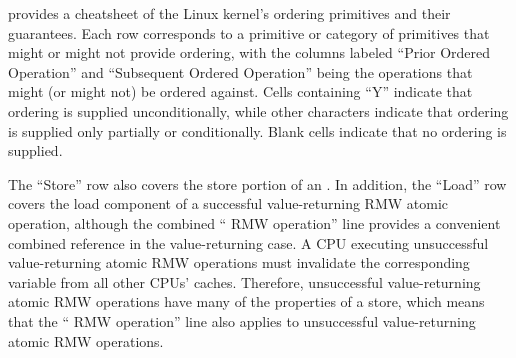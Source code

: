 \begin{table}
\vspace{5pt}\hfill
{}
\caption{Linux-Kernel Memory-Ordering Cheat Sheet}
\label{tab:memorder:Linux-Kernel Memory-Ordering Cheat Sheet}
\end{table}

provides a cheatsheet of the Linux kernel's ordering primitives and their
guarantees.
Each row corresponds to a primitive or category of primitives that might
or might not provide ordering, with the columns labeled
``Prior Ordered Operation'' and ``Subsequent Ordered Operation''
being the operations that might (or might not) be ordered against.
Cells containing ``Y'' indicate that ordering is supplied unconditionally,
while other characters indicate that ordering is supplied only partially or
conditionally.
Blank cells indicate that no ordering is supplied.

The ``Store'' row also covers the store portion of an
.
In addition, the ``Load'' row covers the load
component of a successful value-returning  RMW atomic
operation, although the combined `` RMW operation''
line provides a convenient combined reference in the value-returning case.
A CPU executing unsuccessful value-returning atomic RMW operations must
invalidate the corresponding variable from all other CPUs' caches.
Therefore, unsuccessful value-returning atomic RMW operations have many
of the properties of a store, which means that the ``
RMW operation'' line also applies to unsuccessful value-returning atomic
RMW operations.

